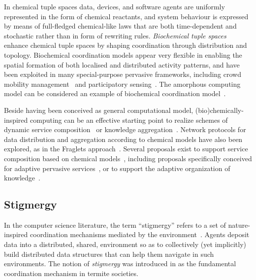 \documentclass[12pt,a4paper,twoside,openright]{book}
\begin{document}
In chemical tuple spaces \cite{chemcoord-soarbook} data, devices, and software agents are uniformly represented in the form of chemical reactants, and system behaviour is expressed by means of full-fledged chemical-like laws that are both time-dependent and stochastic rather than in form of rewriting rules.
%
\emph{Biochemical tuple spaces}~\cite{VCMZ-TAAS2011} enhance chemical tuple spaces by shaping coordination through distribution and topology.
%
Biochemical coordination models appear very flexible in enabling the spatial formation of both localised and distributed activity patterns, and have been exploited in many special-purpose pervasive frameworks, including crowd mobility management~\cite{werfel} and participatory sensing~\cite{lee}. The amorphous computing model can be considered an example of biochemical coordination model~\cite{amorphous}.

Beside having been conceived as general computational model, (bio)chemically-inspired computing can be an effective starting point to realize schemes of dynamic service composition~\cite{frei} or knowledge aggregation~\cite{mariani2013molecules}.
%
Network protocols for data distribution and aggregation according to chemical models have also been explored, as in the Fraglets approach~\cite{Meyer07,Monti13}.
%
Several proposals exist to support service composition based on chemical models~\cite{BanP09}, including proposals specifically conceived for adaptive pervasive services~\cite{cpe}, or to support the adaptive organization of knowledge~\cite{mariani2013molecules}.

\subsection{Stigmergy}

In the computer science literature, the term ``stigmergy'' refers to a set of nature-inspired coordination mechanisms mediated by the environment~\cite{stigmergyhistory-artificiallife5,stigmergy-artificiallife5}.
%
Agents deposit data into a distributed, shared, environment so as to collectively (yet implicitly) build distributed data structures that can help them navigate in such environments.
%
The notion of \emph{stigmergy} was introduced in \cite{stigmergy-grasse59} as the fundamental coordination mechanism in termite societies.
\end{document}
